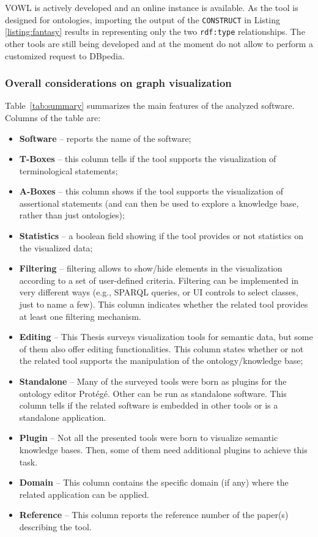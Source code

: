 \begin{description}[wide, labelindent=0pt]
VOWL is actively developed and an online instance is available. As the tool is designed for ontologies, importing the output of the \texttt{CONSTRUCT} in Listing \ref{listing:fantasy} results in representing only the two \texttt{rdf:type} relationships. The other tools are still being developed and at the moment do not allow to perform a customized request to DBpedia.
\end{description}

\subsubsection{\textsf{Overall considerations on graph visualization}}
Table~\ref{tab:summary} summarizes the main features of the analyzed software. Columns of the table are:

\begin{itemize}
  \item \textbf{Software} -- reports the name of the software;
  \item \textbf{T-Boxes} -- this column tells if the tool supports the visualization of terminological statements;
  \item \textbf{A-Boxes} -- this column shows if the tool supports the visualization of assertional statements (and can then be used to explore a knowledge base, rather than just ontologies);
  \item \textbf{Statistics} -- a boolean field showing if the tool provides or not statistics on the visualized data;
  \item \textbf{Filtering} -- filtering allows to show/hide elements in the visualization according to a set of user-defined criteria. Filtering can be implemented in very different ways (e.g., SPARQL queries, or UI controls to select classes, just to name a few). This column indicates whether the related tool provides at least one filtering mechanism.
  \item \textbf{Editing} -- This Thesis surveys visualization tools for semantic data, but some of them also offer editing functionalities. This column states whether or not the related tool supports the manipulation of the ontology/knowledge base;
  \item \textbf{Standalone} -- Many of the surveyed tools were born as plugins for the ontology editor Prot\'eg\'e. Other can be run as standalone software. This column tells if the related software is embedded in other tools or is a standalone application. 
  \item \textbf{Plugin} -- Not all the presented tools were born to visualize semantic knowledge bases. Then, some of them need additional plugins to achieve this task.
  \item \textbf{Domain} -- This column contains the specific domain (if any) where the related application can be applied.
  \item \textbf{Reference} -- This column reports the reference number of the paper(s) describing the tool.
\end{itemize}

